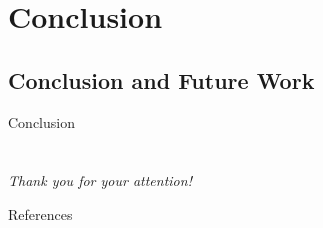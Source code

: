\documentclass[8pt, aspectratio=169]{beamer}
\begin{document}
\section{Conclusion}

\subsection{Conclusion and Future Work}

\begin{frame}{Conclusion}
    
\end{frame}

\section{}
\begin{frame}{}
    \centering \Large
    \emph{Thank you for your attention!}
\end{frame}

\begin{frame}[allowframebreaks]{References}

  
  

\end{frame}
\end{document}
